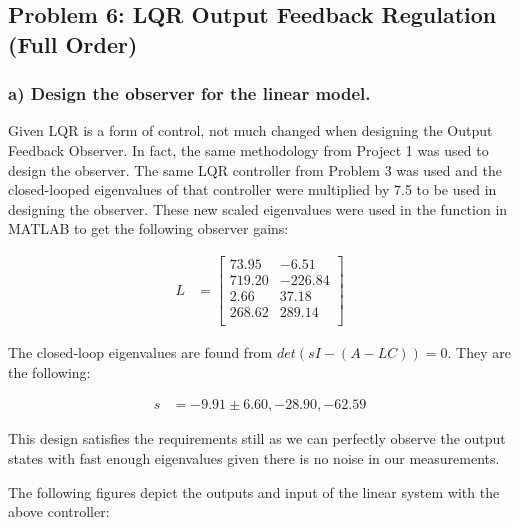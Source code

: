 \subsection*{Problem 6: LQR Output Feedback Regulation (Full Order)}
\subsubsection*{a) Design the observer for the linear model.}


Given LQR is a form of control, not much changed when designing the Output Feedback Observer. In fact, the same methodology from Project 1 was used to design the observer. The same LQR controller from Problem 3 was used and the closed-looped eigenvalues of that controller were multiplied by 7.5 to be used in designing the observer. These new scaled eigenvalues were used in the  function in MATLAB to get the following observer gains:

\begin{equation*}
    \begin{split}
        L & =
        \begin{bmatrix}
            73.95  & -6.51   \\
            719.20 & -226.84 \\
            2.66   & 37.18   \\
            268.62 & 289.14  \\
        \end{bmatrix}
    \end{split}
\end{equation*}

The closed-loop eigenvalues are found from $det(sI-(A-LC))=0$. They are the following:

\begin{equation*}
    \begin{split}
        s & = -9.91\pm6.60, -28.90, -62.59
    \end{split}
\end{equation*}

This design satisfies the requirements still as we can perfectly observe the output states with fast enough eigenvalues given there is no noise in our measurements.

The following figures depict the outputs and input of the linear system with the above controller:

